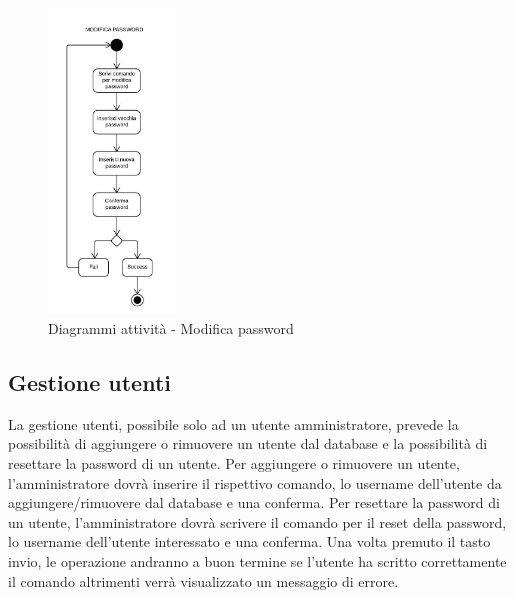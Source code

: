 \documentclass{scalatekids-article}
\begin{document}
\begin{figure}[H]
  \begin{center}
    \includegraphics[width=0.3\textwidth, keepaspectratio]{img/diagrammiAttivita/modificaPsw.jpeg}
    \caption{Diagrammi attività - Modifica password}
  \end{center}
\end{figure}

\subsection{Gestione utenti}

La gestione utenti, possibile solo ad un utente amministratore, prevede la
possibilità di aggiungere o rimuovere un utente dal database e la possibilità
di resettare la password di un utente. Per aggiungere o rimuovere un utente,
l'amministratore dovrà inserire il rispettivo comando, lo username dell'utente
da aggiungere/rimuovere dal database e una conferma. Per resettare la password
di un utente, l'amministratore dovrà scrivere il comando per il reset della
password, lo username dell'utente interessato e una conferma. Una volta
premuto il tasto invio, le operazione andranno a buon termine se l'utente ha
scritto correttamente il comando altrimenti verrà visualizzato un messaggio di
errore.
\end{document}
